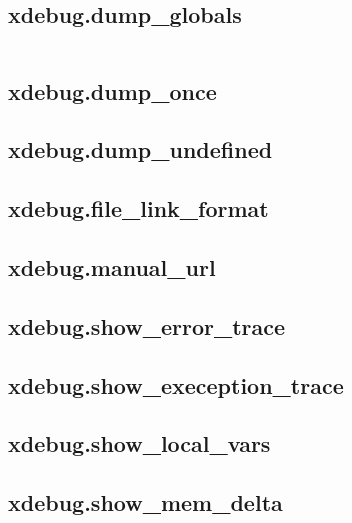 \begin{lstlisting}[language=PHP]

\end{lstlisting}


\subsection{xdebug.dump\_globals}


\begin{lstlisting}[language=PHP]

\end{lstlisting}


\subsection{xdebug.dump\_once}


\subsection{xdebug.dump\_undefined}


\subsection{xdebug.file\_link\_format}

\subsection{xdebug.manual\_url}



\subsection{xdebug.show\_error\_trace}


\subsection{xdebug.show\_exeception\_trace}



\subsection{xdebug.show\_local\_vars}


\subsection{xdebug.show\_mem\_delta}


